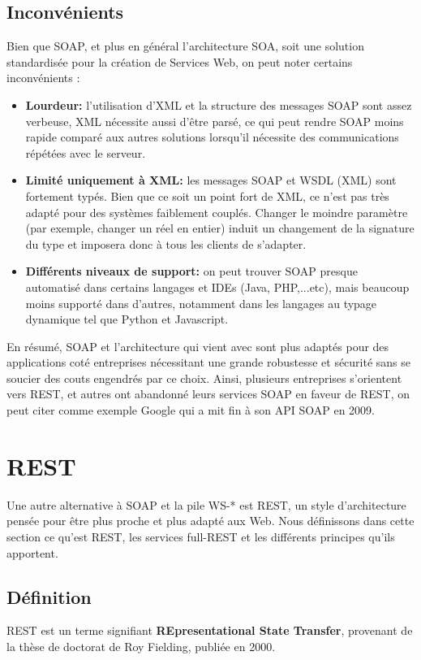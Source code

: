 \subsection{Inconvénients}
Bien que SOAP, et plus en général l'architecture SOA, soit une solution standardisée pour la création de Services Web, on peut noter certains inconvénients :
\begin{itemize}
	\item \textbf{Lourdeur:} l'utilisation d'XML et la structure des messages SOAP sont assez verbeuse, XML nécessite aussi d'être parsé, ce qui peut rendre SOAP moins rapide comparé aux autres solutions lorsqu'il nécessite des communications répétées avec le serveur.
	\item \textbf{Limité uniquement à XML:} les messages SOAP et WSDL (XML) sont fortement typés. Bien que ce soit un point fort de XML, ce n'est pas très adapté pour des systèmes faiblement couplés. Changer le moindre paramètre (par exemple, changer un réel en entier) induit un changement de la signature du type et imposera donc à tous les clients de s'adapter.
	\item \textbf{Différents niveaux de support:} on peut trouver SOAP presque automatisé dans certains langages et IDEs (Java, PHP,...etc), mais beaucoup moins supporté dans d'autres, notamment dans les langages au typage dynamique tel que Python et Javascript.
\end{itemize}

En résumé, SOAP et l'architecture qui vient avec sont plus adaptés pour des applications coté entreprises nécessitant une grande robustesse et sécurité sans se soucier des couts engendrés par ce choix.
Ainsi, plusieurs entreprises s'orientent vers REST, et autres ont abandonné leurs services SOAP en faveur de REST, on peut citer comme exemple Google qui a mit fin à son API SOAP en 2009.
\newpage

\section{REST}
Une autre alternative à SOAP et la pile WS-* est REST, un style d'architecture pensée pour être plus proche et plus adapté aux Web. Nous définissons dans cette section ce qu'est REST, les services full-REST et les différents principes qu'ils apportent.

\subsection{Définition}
REST est un terme signifiant \textbf{REpresentational State Transfer}, provenant de la thèse de doctorat de Roy Fielding, publiée en 2000.

